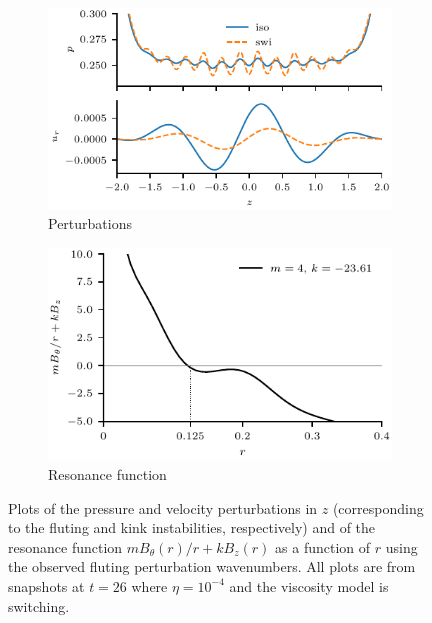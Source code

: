 \begin{figure}[t]
  \centering
    \begin{subfigure}{0.49\textwidth}
      \includegraphics[width=\linewidth]{perturbations_4.pdf}
      \caption{Perturbations}
      \label{fig:pressure_pert_4}
    \end{subfigure}
    \hfill
    \begin{subfigure}{0.49\textwidth}
      \includegraphics[width=\linewidth]{resonant_surface_4.pdf}
      \caption{Resonance function}
      \label{fig:resonant_surface_4}
    \end{subfigure}
\caption{Plots of the pressure and velocity perturbations in $z$ (corresponding to the fluting and kink instabilities, respectively) and of the resonance function $m B_{\theta}(r)/r + kB_z(r)$ as a function of $r$ using the observed fluting perturbation wavenumbers. All plots are from snapshots at $t=26$ where $\eta=10^{-4}$ and the viscosity model is switching.}
\label{fig:k_and_resonance}%
\end{figure}

